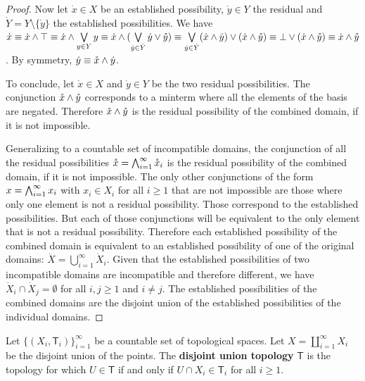 \documentclass[11pt,letterpaper,fleqn]{memoir} %
\begin{document}
\begin{mathSection}
\begin{proof}
		Now let $\dot{x} \in X$ be an established possibility, $\mathring{y} \in Y$ the residual and $\dot{Y} = Y \setminus \{\mathring{y}\}$ the established possibilities. We have $\dot{x} \equiv \dot{x} \wedge \top \equiv \dot{x} \wedge \bigvee\limits_{y \in Y} y \equiv \dot{x} \wedge (\bigvee\limits_{\dot{y} \in \dot{Y}} \dot{y} \vee \mathring{y}) \equiv \bigvee\limits_{\dot{y} \in \dot{Y}} (\dot{x} \wedge \dot{y}) \vee (\dot{x} \wedge \mathring{y}) \equiv \bot \vee (\dot{x} \wedge \mathring{y}) \equiv \dot{x} \wedge \mathring{y}$. By symmetry, $\dot{y} \equiv \mathring{x} \wedge \dot{y}$.
		
		To conclude, let $\mathring{x} \in X$ and $\mathring{y} \in Y$ be the two residual possibilities. The conjunction $\mathring{x} \wedge \mathring{y}$ corresponds to a minterm where all the elements of the basis are negated. Therefore $\mathring{x} \wedge \mathring{y}$ is the residual possibility of the combined domain, if it is not impossible. 
		
		Generalizing to a countable set of incompatible domains, the conjunction of all the residual possibilities $\mathring{x}= \bigwedge_{i=1}^{\infty} \mathring{x}_i$ is the residual possibility of the combined domain, if it is not impossible. The only other conjunctions of the form $x= \bigwedge_{i=1}^{\infty} x_i$ with $x_i \in X_i$ for all $i \geq 1$ that are not impossible are those where only one element is not a residual possibility. Those correspond to the established possibilities. But each of those conjunctions will be equivalent to the only element that is not a residual possibility. Therefore each established possibility of the combined domain is equivalent to an established possibility of one of the original domains: $\dot{X} = \bigcup\limits_{i=1}^{\infty} \dot{X}_i$. Given that the established possibilities of two incompatible domains are incompatible and therefore different, we have $\dot{X}_i \cap \dot{X}_j = \emptyset$ for all $i,j \geq 1$ and $i \neq j$. The established possibilities of the combined domains are the disjoint union of the established possibilities of the individual domains.
	\end{proof}

	\begin{defn}
		Let $\{(X_i, \mathsf{T}_i)\}_{i=1}^{\infty}$ be a countable set of topological spaces. Let $X=\coprod\limits_{i=1}^{\infty} X_i$ be the disjoint union of the points. The \textbf{disjoint union topology} $\mathsf{T}$ is the topology for which $U \in \mathsf{T}$ if and only if $U \cap X_i \in \mathsf{T}_i$ for all $i \geq 1$.
	\end{defn}


\end{mathSection}
\end{document}
